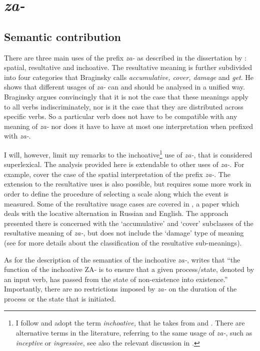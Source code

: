 \section{\textit{za-}}\label{subsection:semantics:za}
\subsection{Semantic contribution}
There are three main uses of the prefix \textit{za-} as described in the dissertation by \citet{Braginsky:08}: spatial, resultative and inchoative. The resultative meaning is further subdivided into four categories that Braginsky calls \textit{accumulative, cover, damage} and \textit{get}. He shows that different usages of \textit{za-} can and should be analysed in a unified way. Braginsky argues convincingly that it is not the case that these meanings apply to all verbs indiscriminately, nor is it the case that they are distributed across specific verbs. So a particular verb does not have to be compatible with any meaning of \textit{za-} nor does it have to have at most one interpretation when prefixed with \textit{za-}.

I will, however, limit my remarks to the inchoative\footnote{I follow \citet{Braginsky:08} and adopt the term \textit{inchoative,} that he takes from \citet{Zemskaja:55} and \citet{Zaliznjak:95}. There are alternative terms in the literature, referring to the same usage of \textit{za-}, such as \textit{inceptive} or \textit{ingressive}, see also the relevant discussion in \citealt{Maslov:65}.} use of \textit{za-}, that is considered superlexical. The analysis provided here is extendable to other uses of \textit{za-}. For example, \cite{ZinovaOsswald:paper} cover the case of the spatial interpretation of the prefix \textit{za-}. The extension to the resultative uses is also possible, but requires some more work in order to define the procedure of selecting a scale along which the event is measured. Some of the resultative usage cases are covered in \citet{Zinova:14}, a paper which deals with the locative alternation in Russian and English. The approach presented there is concerned with the `accumulative' and `cover' subclasses of the resultative meaning of \textit{za-}, but does not include the `damage' type of meaning (see \citealt{Braginsky:08} for more details about the classification of the resultative sub-meanings).

As for the description of the semantics of the inchoative \textit{za-}, \citet{Braginsky:08} writes \citep[following][]{Sheljakin:69} that ``the function of the inchoative ZA- is to ensure that a given process\slash state, denoted by an input verb, has passed from the state of non-existence into existence.'' Importantly, there are no restrictions imposed by \textit{za-} on the duration of the process or the state that is initiated.

